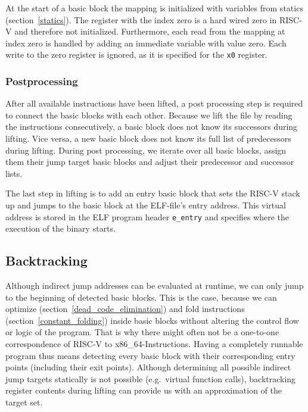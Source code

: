 \documentclass[course=eragp]{aspdoc}
\begin{document}
\par

At the start of a basic block the mapping is initialized
with variables from statics (section~\ref{statics}). The register with the index zero is a hard wired zero in
RISC-V and therefore not initialized. Furthermore, each read from the mapping at index zero is handled by adding an immediate
variable with value zero. Each write to the zero register is ignored, as it is specified for the \texttt{x0}
register.\cite{rvspec}

\subsubsection{Postprocessing}

After all available instructions have been lifted, a post processing step is required to connect
the basic blocks with each other. Because we lift the file by reading the instructions
consecutively, a basic block does not know its successors during lifting. Vice versa, a new basic
block does not know its full list of predecessors during lifting.
During post processing, we iterate over all basic blocks, assign them their jump target basic
blocks and adjust their predecessor and successor lists.

\par

The last step in lifting is to add an entry basic block that sets the RISC-V stack up and jumps to the
basic block at the ELF-file's entry address. This virtual address is stored in the ELF program header
\texttt{e\_entry} and specifies where the execution of the binary starts.\cite{elf_spec}


\subsection{Backtracking}\label{backtracking}
Although indirect jump addresses can be evaluated at runtime, we can only jump to the beginning of
detected basic blocks. This is the case, because we can optimize (section~\ref{dead_code_elimination}) and fold
instructions (section~\ref{constant_folding}) inside basic blocks without altering the control flow or
logic of the program. That is why there might often not be a one-to-one correspondence of RISC-V to x86\_64-Instructions.
Having a completely runnable program thus means detecting every basic block
with their corresponding entry points (including their exit points). Although determining all possible
indirect jump targets statically is not possible (e.g.\ virtual function calls),
backtracking register contents during lifting can provide us with
an approximation of the target set.
\end{document}
